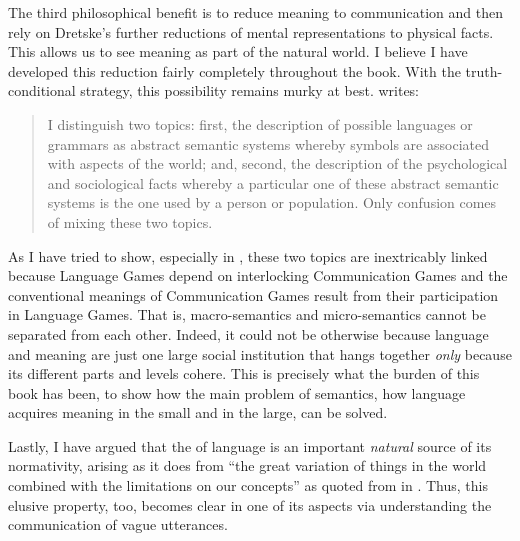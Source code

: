 
The third philosophical benefit is to reduce meaning to communication and then rely on Dretske's further reductions of mental representations to physical facts. This allows us to see meaning as part of the natural world. I believe I have developed this reduction fairly completely throughout the book. With the truth-conditional strategy, this possibility remains murky at best. \citet[170]{lewis:gs} writes:

\begin{quote}
I distinguish two topics: first, the description of possible languages or grammars as abstract semantic systems whereby symbols are associated with aspects of the world; and, second, the description of the psychological and sociological facts whereby a particular one of these abstract semantic systems is the one used by a person or population. Only confusion comes of mixing these two topics.
\end{quote}

As I have tried to show, especially in , these two topics are inextricably linked because Language Games depend on interlocking Communication Games and the conventional meanings of Communication Games result from their participation in Language Games. That is, macro-semantics and micro-semantics cannot be separated from each other. Indeed, it could not be otherwise because language and meaning are just one large social institution that hangs together \emph{only} because its different parts and levels cohere. This is precisely what the burden of this book has been, to show how the main problem of semantics, how language acquires meaning in the small and in the large, can be solved.


Lastly, I have argued that the  of language is an important \emph{natural} source of its normativity, arising as it does from ``the great variation of things in the world combined with the limitations on our concepts'' as quoted from \citet[21]{murphy:bbc} in . Thus, this elusive property, too, becomes clear in one of its aspects via understanding the communication of vague utterances.

